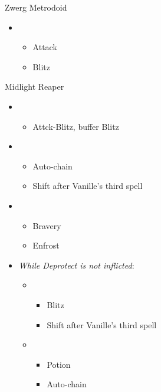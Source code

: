 \begin{multicols}{2}
  \begin{battle}{Zwerg Metrodoid}
    \begin{itemize}
      \item \first
            \begin{itemize}
              \item Attack
              \item Blitz
            \end{itemize}
    \end{itemize}
  \end{battle}

  \begin{battle}{Midlight Reaper}
    \begin{itemize}
      \item \first
            \begin{itemize}
              \item Attck-Blitz, buffer Blitz
            \end{itemize}
      \item \fifth
            \begin{itemize}
              \item Auto-chain
              \item Shift after Vanille's third spell
            \end{itemize}
      \item \third
            \begin{itemize}
              \item Bravery
              \item Enfrost
            \end{itemize}
      \item \textit{While Deprotect is not inflicted}:
            \begin{itemize}
              \item \sixth
                    \begin{itemize}
                      \item Blitz
                      \item Shift after Vanille's third spell
                    \end{itemize}
              \item \fifth
                    \begin{itemize}
                      \item Potion
                      \item Auto-chain

\end{itemize}
\end{itemize}
\end{itemize}
\end{battle}
\end{multicols}
